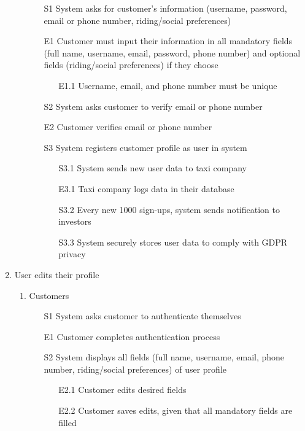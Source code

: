 \documentclass[]{article}
\begin{document}
\begin{enumerate}[{BE}1.]
\begin{enumerate}[{VP1}.1]
			\begin{enumerate}
				\item[S1] System asks for customer’s information (username, password, email or phone number, riding/social preferences)
				\item[E1] Customer must input their information in all mandatory fields (full name, username, email, password, phone number) and optional fields (riding/social preferences) if they choose
				\begin{enumerate}
				\item[E1.1] Username, email, and phone number must be unique
				\end{enumerate}
				\item[S2] System asks customer to verify email or phone number
				\item[E2] Customer verifies email or phone number
				\item[S3] System registers customer profile as user in system
				\begin{enumerate}
				\item[S3.1] System sends new user data to taxi company
				\item[E3.1] Taxi company logs data in their database
				\item[S3.2] Every new 1000 sign-ups, system sends notification to investors
				\item[S3.3] System securely stores user data to comply with GDPR privacy
				\end{enumerate}
			\end{enumerate}
	\end{enumerate}
	\item User edits their profile
	\begin{enumerate}[{VP2}.1]
		\item Customers
			\begin{enumerate}
				\item[S1] System asks customer to authenticate themselves
           			\item[E1] Customer completes authentication process
				\item[S2] System displays all fields (full name, username, email, phone number, riding/social preferences) of user profile
				\begin{enumerate}
					\item[E2.1] Customer edits desired fields
					\item[E2.2] Customer saves edits, given that all mandatory fields are filled
				\end{enumerate}

\end{enumerate}
\end{enumerate}
\end{enumerate}
\end{document}
